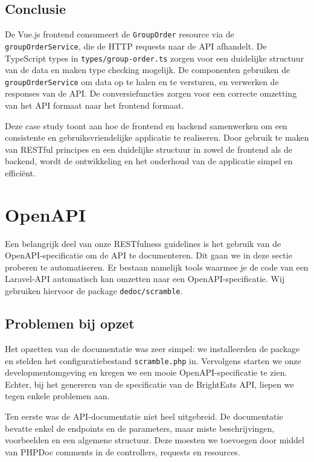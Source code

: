 \subsection{Conclusie}

De Vue.js frontend consumeert de \texttt{GroupOrder} resource via de \texttt{groupOrderService}, die de HTTP requests naar de API afhandelt. De TypeScript types in \texttt{types/group-order.ts} zorgen voor een duidelijke structuur van de data en maken type checking mogelijk. De componenten gebruiken de \texttt{groupOrderService} om data op te halen en te versturen, en verwerken de responses van de API. De conversiefuncties zorgen voor een correcte omzetting van het API formaat naar het frontend formaat.

Deze case study toont aan hoe de frontend en backend samenwerken om een consistente en gebruiksvriendelijke applicatie te realiseren. Door gebruik te maken van RESTful principes en een duidelijke structuur in zowel de frontend als de backend, wordt de ontwikkeling en het onderhoud van de applicatie simpel en efficiënt.

\section{OpenAPI}

Een belangrijk deel van onze RESTfulness guidelines is het gebruik van de OpenAPI-specificatie om de API te documenteren. Dit gaan we in deze sectie proberen te automatiseren. Er bestaan namelijk tools waarmee je de code van een Laravel-API automatisch kan omzetten naar een OpenAPI-specificatie. Wij gebruiken hiervoor de package \texttt{dedoc/scramble}.

\subsection{Problemen bij opzet}

Het opzetten van de documentatie was zeer simpel: we installeerden de package en stelden het configuratiebestand \texttt{scramble.php} in. Vervolgens starten we onze developmentomgeving en kregen we een mooie OpenAPI-specificatie te zien. Echter, bij het genereren van de specificatie van de BrightEats API, liepen we tegen enkele problemen aan.

\bigskip

Ten eerste was de API-documentatie niet heel uitgebreid. De documentatie bevatte enkel de endpoints en de parameters, maar miste beschrijvingen, voorbeelden en een algemene structuur. Deze moesten we toevoegen door middel van PHPDoc comments in de controllers, requests en resources.

